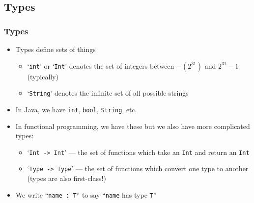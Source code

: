 \documentclass{beamer}
\begin{document}
  \subsection{Types}
  \begin{frame}
    \frametitle{Types}

    \begin{itemize}
      \item Types define sets of things
      \begin{itemize}
        \item `\texttt{int}' or `\texttt{Int}' denotes the set of integers
        between $-(2^{31})$ and $2^{31} - 1$ (typically)
        \item `\texttt{String}' denotes the infinite set of all possible strings
      \end{itemize}
      \item In Java, we have \texttt{int}, \texttt{bool}, \texttt{String}, etc.
      \item In functional programming, we have these but we also have more
      complicated types:
      \begin{itemize}
        \item `\texttt{Int -> Int}' --- the set of functions which take an
        \texttt{Int} and return an \texttt{Int}
        \item `\texttt{Type -> Type}' --- the set of functions which convert one
        type to another (types are also first-class!)
      \end{itemize}
      \item We write ``\texttt{name : T}'' to say ``\texttt{name} has type
      \texttt{T}''
    \end{itemize}

  \end{frame}
\end{document}

